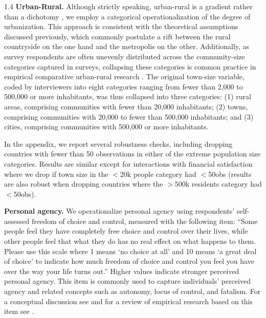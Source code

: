 \documentclass[10pt, letterpaper]{article}
\begin{document}
\begin{spacing}{1.4}
\textbf{Urban-Rural.} Although strictly speaking, urban-rural is a gradient rather than a dichotomy \citep{aok-ls_fisher16}, we employ a categorical operationalization of the degree of urbanization. This approach is consistent with the theoretical
assumptions discussed previously, which commonly postulate a rift between the rural countryside on the one hand and the metropolis on the other. Additionally, as survey respondents are often unevenly distributed across the community-size categories captured in surveys, collapsing these categories is common practice in empirical comparative urban-rural research \citep{aok21}. The original town-size variable, coded by interviewers into eight categories ranging from fewer than
2,000 to 500,000 or more inhabitants, was thus collapsed into three categories:
(1) rural areas, comprising communities with fewer than 20,000 inhabitants; (2) towns, comprising communities with 20,000 to fewer than 500,000 inhabitants; and (3) cities, comprising communities with 500,000 or more inhabitants.

In the appendix, we report several robustness checks,
including dropping countries with fewer than 50 observations in either of the
extreme population size categories. 
 Results are similar except for interactions with financial satisfaction where we
drop if town size in the $<$20k people category had $<$50obs
(results are also robust when dropping countries where the $>$500k residents category had $<$50obs).

\textbf{Personal agency.} We operationalize personal agency using respondents' self-assessed freedom of choice and control, measured with the following item:
``Some people feel they have completely free choice and control over their lives, while other people feel that what they do has no real effect on what happens to them. Please use this scale where 1 means `no choice at all' and 10 means `a
great deal of choice' to indicate how much freedom of choice and control you feel you have over the way your life turns out.'' Higher values indicate stronger perceived personal agency. This item is commonly used to capture individuals' perceived agency
\citep[e.g.,][]{verme09,inglehart08,veenhoven00_b,aok_free_from_to}
and related concepts such as autonomy, locus of control,
and fatalism. For a conceptual discussion see  \citet[][]{kouba16} and
for a review of empirical research based on this item see
\citet{steckermeier2022}. 


\end{spacing}
\end{document}
